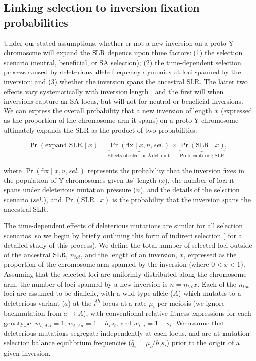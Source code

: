\documentclass{article}[12pt]
\begin{document}
\subsection*{Linking selection to inversion fixation probabilities}

Under our stated assumptions, whether or not a new inversion on a proto-Y chromosome will expand the SLR depends upon three factors: (1) the selection scenario (neutral, beneficial, or SA selection); (2) the time-dependent selection process caused by deleterious allele frequency dynamics at loci spanned by the inversion; and (3) whether the inversion spans the ancestral SLR. The latter two effects vary systematically with inversion length \citep{ConnallonOlito2021, Olito-etal-2022}, and the first will when inversions capture an SA locus, but will not for neutral or beneficial inversions. We can express the overall probability that a new inversion of length $x$ (expressed as the proportion of the chromosome arm it spans) on a proto-Y chromosome ultimately expands the SLR as the product of two probabilities:
\begin{linenomath*}
\begin{equation}\label{eq:generalPrFix}
  \Pr(\text{expand SLR} \mid x) = \underbrace{\Pr(\text{fix} \mid x, n,sel.)}_{\text{Effects of selection \& del. mut.}} \times \underbrace{\Pr(\text{SLR} \mid x)}_{\text{Prob. capturing SLR}},
\end{equation}
\end{linenomath*}

\noindent where $\Pr(\text{fix} \mid x, n, sel.)$ represents the probability that the inversion fixes in the population of Y chromosomes given its' length ($x$), the number of loci it spans under deleterious mutation pressure ($n$), and the details of the selection scenario ($sel.$), and $\Pr(\text{SLR} \mid x)$ is the probability that the inversion spans the ancestral SLR.

The time-dependent effects of deleterious mutations are similar for all selection scenarios, so we begin by briefly outlining this form of indirect selection (\citealt[see][]{Olito-etal-2022} for a detailed study of this process). We define the total number of selected loci outside of the ancestral SLR, $n_{tot}$, and the length of an inversion, $x$, expressed as the proportion of the chromosome arm spanned by the inversion (where $0 < x < 1$). Assuming that the selected loci are uniformly distributed along the chromosome arm, the number of loci spanned by a new inversion is $n = n_{tot}x$. Each of the $n_{tot}$ loci are assumed to be diallelic, with a wild-type allele ($A$) which mutates to a deleterious variant ($a$) at the $i^{th}$ locus at a rate $\mu_i$ per meiosis (we ignore backmutation from $a \rightarrow A$), with conventional relative fitness expressions for each genotype: $w_{i,AA} = 1$, $w_{i,Aa} = 1 - h_i s_i$, and $w_{i,a} = 1 - s_i$. We assume that deleterious mutations segregate independently at each locus, and are at mutation-selection balance equilibrium frequencies ($\hat{q}_i = \mu_i/h_i s_i$) prior to the origin of a given inversion. 
\end{document}
